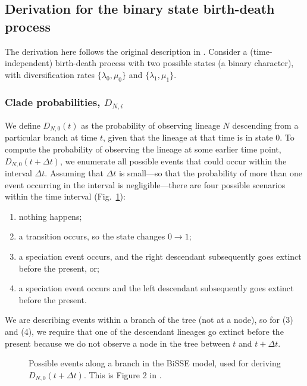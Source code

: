 
\subsection{Derivation for the binary state birth-death process}

The derivation here follows the original description in \citet{Maddison2007}.
Consider a (time-independent) birth-death process with two possible states (a binary character), with diversification rates $\{\lambda_0, \mu_0\}$ and $\{\lambda_1, \mu_1\}$.

\subsubsection{Clade probabilities, $D_{N, i}$}

We define $D_{N,0}(t)$ as the probability of observing lineage $N$ descending from a particular branch at time $t$, given that the lineage at that time is in state 0.
To compute the probability of observing the lineage at some earlier time point, $D_{N,0}(t + \Delta t)$, we enumerate all possible events that could occur within the interval $\Delta t$.
Assuming that $\Delta t$ is small---so that the probability of more than one event occurring in the interval is negligible---there are four possible scenarios within the time interval (Fig.~\ref{fig:BiSSE_Events_D}):
\begin{enumerate}
	\item nothing happens;
	\item a transition occurs, so the state changes $0 \rightarrow 1$;
	\item a speciation event occurs, and the right descendant subsequently goes extinct before the present, or;
	\item a speciation event occurs and the left descendant subsequently goes extinct before the present.
\end{enumerate}
We are describing events within a branch of the tree (not at a node), so for (3) and (4), we require that one of the descendant lineages go extinct before the present because we do not observe a node in the tree between $t$ and $t + \Delta t$.

\begin{figure}
\centering
{}
\caption{\small
    Possible events along a branch in the BiSSE model, used for deriving $D_{N,0}(t + \Delta t)$.
    This is Figure 2 in \citet{Maddison2007}.
}
\label{fig:BiSSE_Events_D}
\end{figure}

